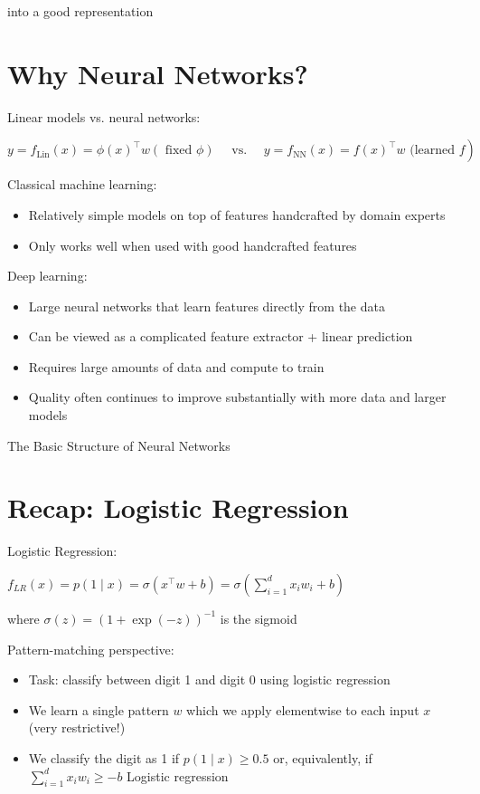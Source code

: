 \documentclass[10pt]{article}
\begin{document}
into a good representation

\section*{Why Neural Networks?}
Linear models vs. neural networks:

$$
\left.y=f_{\operatorname{Lin}}(x)=\phi(x)^{\top} w(\text { fixed } \phi) \quad \text { vs. } \quad y=f_{\mathrm{NN}}(x)=f(x)^{\top} w \text { (learned } f\right)
$$

Classical machine learning:

\begin{itemize}
  \item Relatively simple models on top of features handcrafted by domain experts

  \item Only works well when used with good handcrafted features

\end{itemize}

Deep learning:

\begin{itemize}
  \item Large neural networks that learn features directly from the data

  \item Can be viewed as a complicated feature extractor + linear prediction

  \item Requires large amounts of data and compute to train

  \item Quality often continues to improve substantially with more data and larger models

\end{itemize}

The Basic Structure of Neural Networks

\section*{Recap: Logistic Regression}
Logistic Regression:

$f_{L R}(x)=p(1 \mid x)=\sigma\left(x^{\top} w+b\right)=\sigma\left(\sum_{i=1}^{d} x_{i} w_{i}+b\right)$

where $\sigma(z)=(1+\exp (-z))^{-1}$ is the sigmoid

Pattern-matching perspective:

\begin{itemize}
  \item Task: classify between digit 1 and digit 0 using logistic regression

  \item We learn a single pattern $w$ which we apply elementwise to each input $x$ (very restrictive!)

  \item We classify the digit as 1 if $p(1 \mid x) \geq 0.5$ or, equivalently, if $\sum_{i=1}^{d} x_{i} w_{i} \geq-b$
Logistic regression

\end{itemize}
\end{document}
